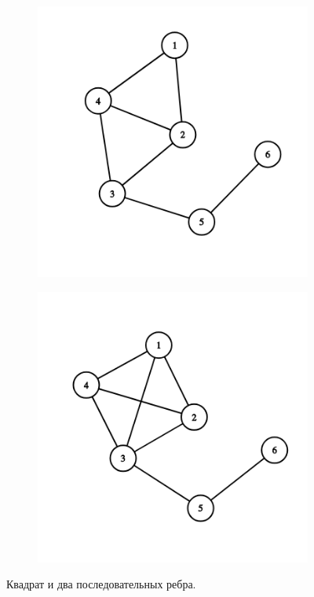 \begin{solution}
\begin{figure}[H]
\begin{subfigure}[a]{0.24\linewidth}
  \end{subfigure}
  \begin{subfigure}[a]{0.24\linewidth}
    \includegraphics[width=\linewidth]{_img/344/06.png}
  \end{subfigure}
  \begin{subfigure}[a]{0.24\linewidth}
    \includegraphics[width=\linewidth]{_img/344/07.png}
  \end{subfigure}
  \caption{Квадрат и два последовательных ребра.}
\end{figure}


\end{solution}
